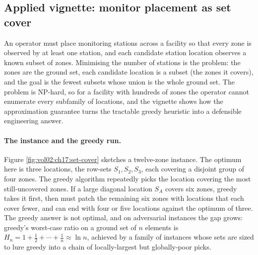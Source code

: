 \subsection{Applied vignette: monitor placement as set cover}

An operator must place monitoring stations across a facility so that
every zone is observed by at least one station, and each candidate
station location observes a known subset of zones. Minimising the
number of stations is the  problem: the zones are
the ground set, each candidate location is a subset (the zones it
covers), and the goal is the fewest subsets whose union is the whole
ground set. The problem is NP-hard, so for a facility with hundreds
of zones the operator cannot enumerate every subfamily of locations,
and the vignette shows how the approximation guarantee turns the
tractable greedy heuristic into a defensible engineering answer.

\paragraph{The instance and the greedy run.}
Figure \ref{fig:vol02:ch17:set-cover} sketches a twelve-zone
instance. The optimum here is three locations, the row-sets
$S_{1}, S_{2}, S_{3}$, each covering a disjoint group of four zones.
The greedy algorithm repeatedly picks the location covering the most
still-uncovered zones. If a large diagonal location $S_{A}$ covers
six zones, greedy takes it first, then must patch the remaining six
zones with locations that each cover fewer, and can end with four or
five locations against the optimum of three. The greedy answer is not
optimal, and on adversarial instances the gap grows: greedy's
worst-case ratio on a ground set of $n$ elements is $H_{n} = 1 +
\tfrac12 + \cdots + \tfrac1n \approx \ln n$, achieved by a family of
instances whose sets are sized to lure greedy into a chain of
locally-largest but globally-poor picks.

